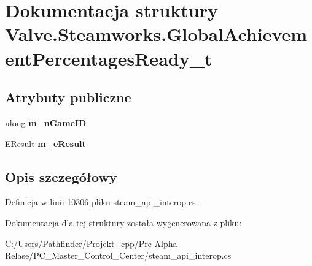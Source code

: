 \hypertarget{struct_valve_1_1_steamworks_1_1_global_achievement_percentages_ready__t}{}\section{Dokumentacja struktury Valve.\+Steamworks.\+Global\+Achievement\+Percentages\+Ready\+\_\+t}
\label{struct_valve_1_1_steamworks_1_1_global_achievement_percentages_ready__t}
\subsection*{Atrybuty publiczne}
\begin{DoxyCompactItemize}
\item 
\mbox{\label{struct_valve_1_1_steamworks_1_1_global_achievement_percentages_ready__t_a77425795406927d23ceef9a3f353b278}} 
ulong {\bfseries m\+\_\+n\+Game\+ID}
\item 
\mbox{\label{struct_valve_1_1_steamworks_1_1_global_achievement_percentages_ready__t_aef45d07893b5ebfeaae5ac46131b3497}} 
E\+Result {\bfseries m\+\_\+e\+Result}
\end{DoxyCompactItemize}


\subsection{Opis szczegółowy}


Definicja w linii 10306 pliku steam\+\_\+api\+\_\+interop.\+cs.



Dokumentacja dla tej struktury została wygenerowana z pliku\+:\begin{DoxyCompactItemize}
\item 
C\+:/\+Users/\+Pathfinder/\+Projekt\+\_\+cpp/\+Pre-\/\+Alpha Relase/\+P\+C\+\_\+\+Master\+\_\+\+Control\+\_\+\+Center/steam\+\_\+api\+\_\+interop.\+cs\end{DoxyCompactItemize}
